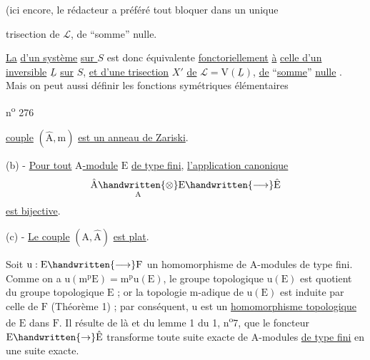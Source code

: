 (ici encore, le rédacteur a préféré tout bloquer dans un unique

trisection de $\mathcal L$, de ``somme'' nulle.

\uline{La}   \uline{d'un système}  \uline{}  \uline{sur $S$} est donc équivalente \uline{fonctoriellement} \uline{à} \uline{celle d'un} \uline{}  \uline{inversible}  $\underline L$ \uline{sur} $S$, \uline{et d'une trisection} $X'$  \uline{de} $\mathcal L=\mathrm V(\underline L)$, \uline{de}  ``\uline{somme}'' \uline{nulle}  . Mais on peut aussi définir les  fonctions symétriques élémentaires 



n\textsuperscript{o} 276

\uline{couple} $(\hat{\mathrm A},\mathrm m)$ \uline{est un anneau de Zariski}.

(b) - \uline{Pour tout} $\mathrm A$\uline{-module} $\mathrm E$ \uline{de type fini}, \uline{l'application canonique}
\[
\hat{\mathrm A}\underset{\mathrm A}{\handwritten{\otimes}}\mathrm E\handwritten{\longrightarrow}\hat{\mathrm E}
\]
\uline{est bijective}.

(c) - \uline{Le couple} $(\mathrm A,\hat{\mathrm A})$ \uline{est plat}.

Soit $\mathrm u:\mathrm E\handwritten{\longrightarrow}\mathrm F$ un homomorphisme de $\mathrm A$-modules de type fini. Comme on a $\mathrm u(\mathrm m^{\mathrm p}\mathrm E)=\mathrm m^{\mathrm p}\mathrm u(\mathrm E)$, le groupe topologique $\mathrm u(\mathrm E)$ est quotient du groupe topologique $\mathrm E$ ; or la topologie $\mathrm m$-adique de $\mathrm u(\mathrm E)$ est induite par celle de $\mathrm F$ (Théorème 1) ; par conséquent, $\mathrm u$ est un \uline{homomorphisme topologique} de $\mathrm E$ dans $\mathrm F$. Il résulte de là et du lemme 1 du \handwritten{\S}1, n\textsuperscript{o}7, que le foncteur $\mathrm E\handwritten{\to}\hat{\mathrm E}$ transforme toute suite exacte de $\mathrm A$-modules \uline{de type fini} en une suite exacte.


